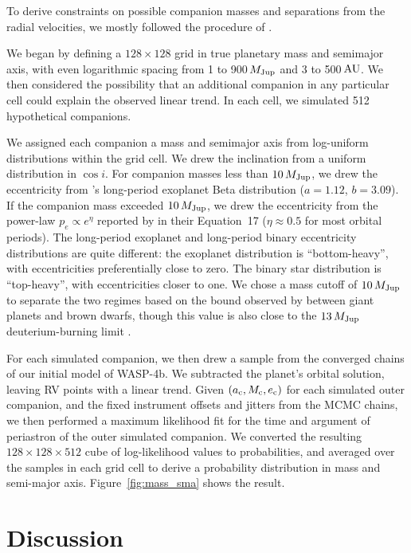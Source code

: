 \documentclass[12pt,twocolumn,tighten]{aastex62}
\begin{document}
To derive constraints on possible companion masses and separations
from the radial velocities, we mostly followed the procedure of
\citet{bryan_excess_2019}. 

We began by defining a $128\times128$ grid in true planetary mass and
semimajor axis, with even logarithmic spacing from 1 to 900$\,$$M_{\rm
Jup}$ and 3 to 500$\,$${\rm AU}$.  We then considered the possibility
that an additional companion in any particular cell could explain the
observed linear trend.  In each cell, we simulated 512 hypothetical
companions.

We assigned each companion a mass and semimajor axis from log-uniform
distributions within the grid cell. We drew the inclination from a
uniform distribution in $\cos i$.  For companion masses less than
$10\,M_{\rm Jup}$, we drew the eccentricity from
\citet{kipping_beta_2013}'s long-period exoplanet Beta distribution
($a=1.12$, $b=3.09$).  If the companion mass exceeded $10\,M_{\rm
Jup}$, we drew the eccentricity from the power-law $p_e \propto
e^\eta$ reported by \citet{moe_mind_2017} in their Equation~17 ($\eta
\approx 0.5$ for most orbital periods).  The long-period exoplanet and
long-period binary eccentricity distributions are quite different: the
exoplanet distribution is ``bottom-heavy'', with eccentricities
preferentially close to zero.  The binary star distribution is
``top-heavy'', with eccentricities closer to one.  We chose a mass
cutoff of $10\,M_{\rm Jup}$ to separate the two regimes based on the
bound observed by \citet{schlaufman_evidence_2018} between giant
planets and brown dwarfs, though this value is also close to the
$13\,M_{\rm Jup}$ deuterium-burning limit \citep[{\it
e.g.},][]{burrows_nongray_1997}.

For each simulated companion, we then drew a sample from the converged
chains of our initial model of WASP-4b. We subtracted the planet's
orbital solution, leaving RV points with a linear trend.  Given
$(a_{\rm c}, M_{\rm c}, e_{\rm c})$ for each simulated outer
companion, and the fixed instrument offsets and jitters from the MCMC
chains, we then performed a maximum likelihood fit for the time and
argument of periastron of the outer simulated companion.  We converted
the resulting $128\times128\times512$ cube of log-likelihood values to
probabilities, and averaged over the samples in each grid cell to
derive a probability distribution in mass and semi-major axis.
Figure~\ref{fig:mass_sma} shows the result.



\section{Discussion}
\label{sec:discussion}
\end{document}
